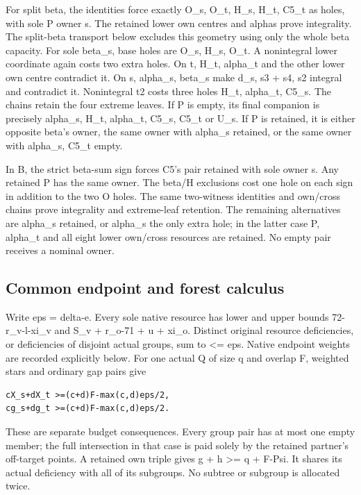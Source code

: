 \documentclass[11pt,a4paper]{article}
\begin{document}
For split beta, the identities force exactly O\_s, O\_t, H\_s, H\_t,
C5\_t as holes, with sole P owner s. The retained lower own centres and
alphas prove integrality. The split-beta transport below excludes this
geometry using only the whole beta capacity. For sole beta\_s, base
holes are O\_s, H\_s, O\_t. A nonintegral lower coordinate again costs
two extra holes. On t, H\_t, alpha\_t and the other lower own centre
contradict it. On s, alpha\_s, beta\_s make d\_s, s3 + s4, s2 integral
and contradict it. Nonintegral t2 costs three holes H\_t, alpha\_t,
C5\_s. The chains retain the four extreme leaves. If P is empty, its
final companion is precisely alpha\_s, H\_t, alpha\_t, C5\_s, C5\_t or
U\_s. If P is retained, it is either opposite beta's owner, the same
owner with alpha\_s retained, or the same owner with alpha\_s, C5\_t
empty.

In B, the strict beta-sum sign forces C5's pair retained with sole owner
s. Any retained P has the same owner. The beta/H exclusions cost one
hole on each sign in addition to the two O holes. The same two-witness
identities and own/cross chains prove integrality and extreme-leaf
retention. The remaining alternatives are alpha\_s retained, or alpha\_s
the only extra hole; in the latter case P, alpha\_t and all eight lower
own/cross resources are retained. No empty pair receives a nominal
owner.

\hypertarget{common-endpoint-and-forest-calculus}{%
\subsection{Common endpoint and forest
calculus}\label{common-endpoint-and-forest-calculus}}

Write eps = delta-e. Every sole native resource has lower and upper
bounds 72-r\_v-l-xi\_v and S\_v + r\_o-71 + u + xi\_o. Distinct original
resource deficiencies, or deficiencies of disjoint actual groups, sum to
\textless= eps. Native endpoint weights are recorded explicitly below.
For one actual Q of size q and overlap F, weighted stars and ordinary
gap pairs give

\begin{verbatim}
cX_s+dX_t >=(c+d)F-max(c,d)eps/2,
cg_s+dg_t >=(c+d)F-max(c,d)eps/2.
\end{verbatim}

These are separate budget consequences. Every group pair has at most one
empty member; the full intersection in that case is paid solely by the
retained partner's off-target points. A retained own triple gives g + h
\textgreater= q + F-Psi. It shares its actual deficiency with all of its
subgroups. No subtree or subgroup is allocated twice.
\end{document}
